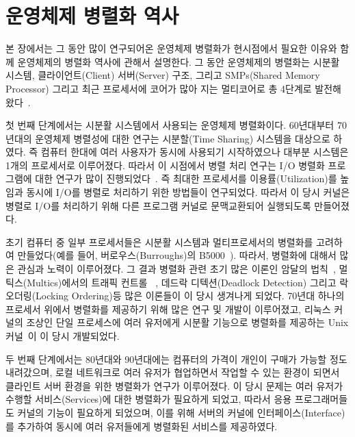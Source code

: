 \section{운영체제 병렬화 역사}
본 장에서는 그 동안 많이 연구되어온 운영체제 병렬화가 현시점에서 필요한 이유와 함께 
운영체제의 병렬화 역사에 관해서 설명한다.
그 동안 운영체제의 병렬화는 시분활 시스템, 클라이언트(Client) 서버(Server) 구조, 그리고 SMPs(Shared Memory
Processor) 그리고 최근 프로세서에 코어가 많아 지는 멀티코어로 총 4단계로 발전해 왔다~\cite{Kaashoek2015PCO}.

첫 번째 단계에서는 시분활 시스템에서 사용되는 운영체제 병렬화이다. 
60년대부터 70년대의 운영체제 병렬성에 대한 연구는 시분할(Time Sharing) 시스템을 대상으로 하였다.
즉 컴퓨터 한대에 여러 사용자가 동시에 사용되기 시작하였으나 대부분 시스템은 1개의 프로세서로 이루어졌다.
따라서 이 시점에서 병렬 처리 연구는 I/O 병렬화 프로그램에 대한 연구가 많이 진행되었다~\cite{Bloch1959EDS}.
즉 최대한 프로세서를 이용률(Utilization)를 높임과 동시에 I/O를 병렬로 처리하기 위한 방법들이 연구되었다.
따라서 이 당시 커널은 병렬로 I/O를 처리하기 위해 다른 프로그램 커널로 문맥교환되어 실행되도록 만들어졌다.
 
초기 컴퓨터 중 일부 프로세서들은 시분활 시스템과 멀티프로세서의 병렬화를 고려하여 
만들었다(예를 들어, 버로우스(Burroughs)의 B5000~\cite{Mayer1982ABB}).
따라서, 병렬화에 대해서 많은 관심과 노력이 이루어졌다.
그 결과 병렬화 관련 초기 많은 이론인 암달의 법칙~\cite{Amdahl1967VSP}, 멀틱스(Multics)에서의 트래픽 컨트롤
~\cite{Saltzer1966TCM}, 데드락 디텍션(Deadlock Detection) 그리고 락 오더링(Locking
Ordering)등 많은 이론들이 이 당시 생겨나게 되었다. 
70년대 하나의 프로세서 위에서 병렬화를 제공하기 위해 많은 연구 및 개발이 이루어졌고, 
리눅스 커널의 조상인 단일 프로세스에 여러 유저에게 시분활 기능으로 병렬화를 제공하는 
Unix 커널~\cite{Ritchie1973UTS}이 이 당시 개발되었다.

두 번째 단계에서는 80년대와 90년대에는 컴퓨터의 가격이 개인이 구매가 가능할 정도 내려갔으며, 
로컬 네트워크로 여러 유저가 협업하면서 작업할 수 있는 환경이 되면서 클라인트 서버 환경을 위한 
병렬화가 연구가 이루어졌다.
이 당시 문제는 여러 유저가 수행할 서비스(Services)에 대한 병렬화가 필요하게 되었고, 
따라서 응용 프로그래머들도 커널의 기능이 필요하게 되었으며, 
이를 위해 서버의 커널에 인터페이스(Interface)를 추가하여 동시에 여러 유저들에게 
병렬화된 서비스를 제공하였다. 
 

